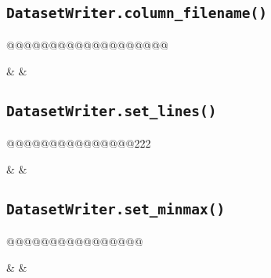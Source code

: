 \subsection{\texttt{DatasetWriter.column\_filename()}}
@@@@@@@@@@@@@@@@@@@
\begin{leftbar}
\starttable
\texttt{} & \texttt{} & \\
\stoptable
\end{leftbar}


\subsection{\texttt{DatasetWriter.set\_lines()}}
@@@@@@@@@@@@@@@222
\begin{leftbar}
\starttable
\texttt{} & \texttt{} & \\
\stoptable
\end{leftbar}


\subsection{\texttt{DatasetWriter.set\_minmax()}}
@@@@@@@@@@@@@@@@
\begin{leftbar}
\starttable
\texttt{} & \texttt{} & \\
\stoptable
\end{leftbar}


